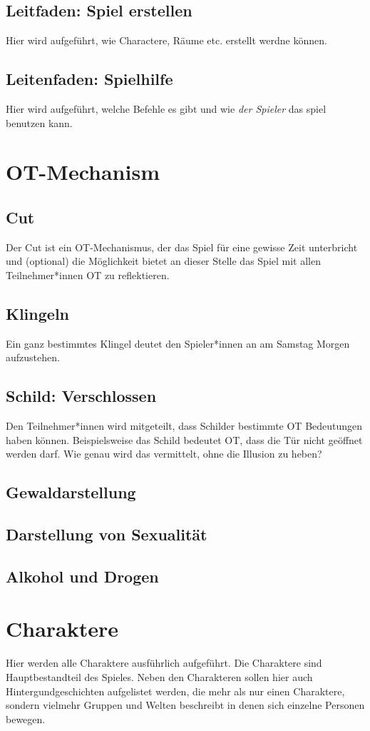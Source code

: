 \documentclass[12pt, a4paper, openany]{report}
\begin{document}
\section{Leitfaden: Spiel erstellen}
Hier wird aufgeführt, wie Charactere, Räume etc. erstellt werdne können.

\section{Leitenfaden: Spielhilfe}
Hier wird aufgeführt, welche Befehle es gibt und wie \textit{der Spieler} das spiel benutzen kann.

\chapter{OT-Mechanism}
\section{Cut} \label{cut}
Der Cut ist ein OT-Mechanismus, der das Spiel für eine gewisse Zeit unterbricht und (optional) die Möglichkeit bietet an dieser Stelle das Spiel mit allen Teilnehmer*innen OT zu reflektieren. 
\section{Klingeln}
Ein ganz bestimmtes Klingel deutet den Spieler*innen an am Samstag Morgen aufzustehen.
\section{Schild: Verschlossen}
Den Teilnehmer*innen wird mitgeteilt, dass Schilder bestimmte OT Bedeutungen haben können. 
Beispielsweise das Schild  bedeutet OT, dass die Tür nicht geöffnet werden darf.
Wie genau wird das vermittelt, ohne die Illusion zu heben? 
\section{Gewaldarstellung}
\section{Darstellung von Sexualität}
\section{Alkohol und Drogen}

\chapter{Charaktere}
Hier werden alle Charaktere ausführlich aufgeführt. 
Die Charaktere sind Hauptbestandteil des Spieles. 
Neben den Charakteren sollen hier auch Hintergundgeschichten aufgelistet werden, die mehr als nur einen Charaktere, sondern vielmehr Gruppen und Welten beschreibt in denen sich einzelne Personen bewegen.
\end{document}
